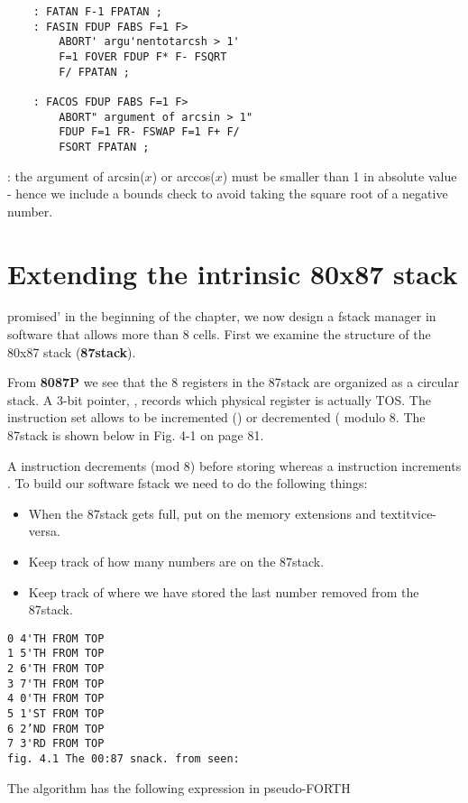 \begin{lstlisting}
    : FATAN F-1 FPATAN ;
    : FASIN FDUP FABS F=1 F>
        ABORT' argu'nentotarcsh > 1'
        F=1 FOVER FDUP F* F- FSQRT
        F/ FPATAN ;

    : FACOS FDUP FABS F=1 F>
        ABORT" argument of arcsin > 1"
        FDUP F=1 FR- FSWAP F=1 F+ F/
        FSORT FPATAN ;
\end{lstlisting}

\leftbar[1\linewidth]
\Note: the argument of arcsin($x$) or arccos($x$) must be smaller than
1 in absolute value - hence we include a bounds check to avoid taking the square root of a negative number.
\endleftbar

\section{Extending the intrinsic 80x87 stack}
 promised' in the beginning of the chapter, we now design
a fstack manager in software that allows more than 8 cells. First we examine the structure of the 80x87 stack (\textbf{87stack}).

From \textbf{8087P} we see that the 8 registers in the 87stack are organized as a circular stack. A 3-bit pointer, , records which physical register is actually TOS. The instruction set allows  to be incremented () or decremented ( modulo 8. The 87stack is shown below in Fig. 4-1 on page 81.

A  instruction decrements  (mod 8) before storing whereas a  instruction increments . To build our software fstack we need to do the following things:
\begin{itemize}
    \item When the 87stack gets full, put  on the memory extensions and textit{vice-versa}.
    \item Keep track of how many numbers are on the 87stack.
    \item Keep track of where we have stored the last number removed from the 87stack.
\end{itemize}

\begin{lstlisting}
0 4'TH FROM TOP
1 5'TH FROM TOP
2 6'TH FROM TOP
3 7'TH FROM TOP
4 0'TH FROM TOP
5 1'ST FROM TOP
6 2’ND FROM TOP
7 3'RD FROM TOP
fig. 4.1 The 00:87 snack. from seen:
\end{lstlisting}

The algorithm has the following expression in pseudo-FORTH

